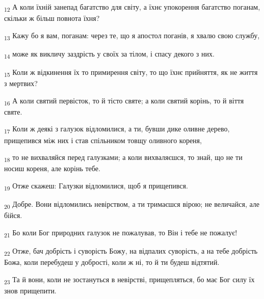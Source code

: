 \begin{tcolorbox}
\textsubscript{12} А коли їхній занепад багатство для світу, а їхнє упокорення багатство поганам, скільки ж більш повнота їхня?
\end{tcolorbox}
\begin{tcolorbox}
\textsubscript{13} Кажу бо я вам, поганам: через те, що я апостол поганів, я хвалю свою службу,
\end{tcolorbox}
\begin{tcolorbox}
\textsubscript{14} може як викличу заздрість у своїх за тілом, і спасу декого з них.
\end{tcolorbox}
\begin{tcolorbox}
\textsubscript{15} Коли ж відкинення їх то примирення світу, то що їхнє прийняття, як не життя з мертвих?
\end{tcolorbox}
\begin{tcolorbox}
\textsubscript{16} А коли святий первісток, то й тісто святе; а коли святий корінь, то й віття святе.
\end{tcolorbox}
\begin{tcolorbox}
\textsubscript{17} Коли ж деякі з галузок відломилися, а ти, бувши дике оливне дерево, прищепився між них і став спільником товщу оливного кореня,
\end{tcolorbox}
\begin{tcolorbox}
\textsubscript{18} то не вихваляйся перед галузками; а коли вихваляєшся, то знай, що не ти носиш кореня, але корінь тебе.
\end{tcolorbox}
\begin{tcolorbox}
\textsubscript{19} Отже скажеш: Галузки відломилися, щоб я прищепився.
\end{tcolorbox}
\begin{tcolorbox}
\textsubscript{20} Добре. Вони відломились невірством, а ти тримаєшся вірою; не величайся, але бійся.
\end{tcolorbox}
\begin{tcolorbox}
\textsubscript{21} Бо коли Бог природних галузок не пожалував, то Він і тебе не пожалує!
\end{tcolorbox}
\begin{tcolorbox}
\textsubscript{22} Отже, бач добрість і суворість Божу, на відпалих суворість, а на тебе добрість Божа, коли перебудеш у добрості, коли ж ні, то й ти будеш відтятий.
\end{tcolorbox}
\begin{tcolorbox}
\textsubscript{23} Та й вони, коли не зостануться в невірстві, прищепляться, бо має Бог силу їх знов прищепити.
\end{tcolorbox}
